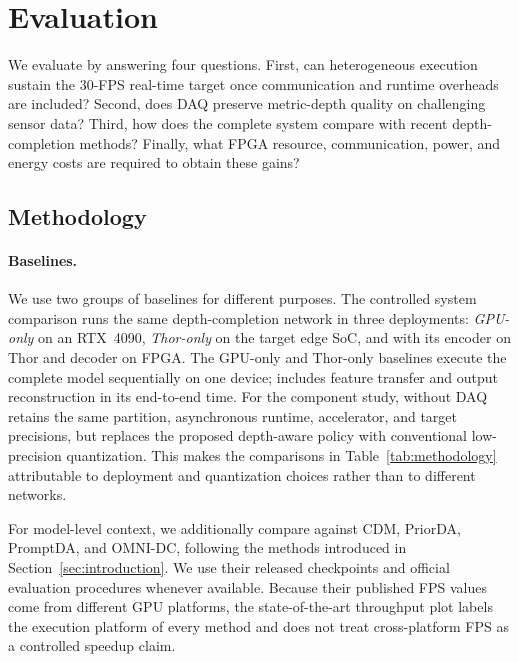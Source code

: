 \section{Evaluation}
\label{sec:evaluation}

We evaluate \system{} by answering four questions.  First, can heterogeneous
execution sustain the 30-FPS real-time target once communication and runtime
overheads are included?  Second, does DAQ preserve metric-depth quality on
challenging sensor data?  Third, how does the complete system compare with
recent depth-completion methods?  Finally, what FPGA resource, communication,
power, and energy costs are required to obtain these gains?

\subsection{Methodology}

\paragraph{Baselines.}
We use two groups of baselines for different purposes.  The controlled system
comparison runs the same depth-completion network in three deployments:
\emph{GPU-only} on an RTX~4090, \emph{Thor-only} on the target edge SoC, and
\system{} with its encoder on Thor and decoder on FPGA.  The GPU-only and
Thor-only baselines execute the complete model sequentially on one device;
\system{} includes feature transfer and output reconstruction in its
end-to-end time.  For the component study, \system{} without DAQ retains the
same partition, asynchronous runtime, accelerator, and target precisions, but
replaces the proposed depth-aware policy with conventional low-precision
quantization.  This makes the comparisons in Table~\ref{tab:methodology}
attributable to deployment and quantization choices rather than to different
networks.

For model-level context, we additionally compare against CDM, PriorDA,
PromptDA, and OMNI-DC, following the methods introduced in
Section~\ref{sec:introduction}.  We use their released checkpoints and official
evaluation procedures whenever available.  Because their published FPS values
come from different GPU platforms, the state-of-the-art throughput plot labels
the execution platform of every method and does not treat cross-platform FPS
as a controlled speedup claim.

